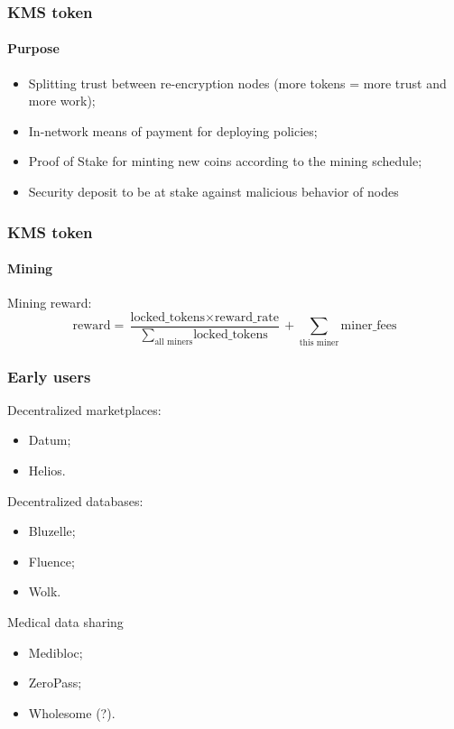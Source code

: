 \documentclass[xetex,mathsans,sans]{beamer}
\begin{document}
    \begin{frame}
        \frametitle{KMS token}
        \framesubtitle{Purpose}
        \begin{itemize}
            \item Splitting trust between re-encryption nodes (more tokens = more trust and more work);
            \item In-network means of payment for deploying policies;
            \item Proof of Stake for minting new coins according to the mining schedule;
            \item Security deposit to be at stake against malicious behavior of nodes
        \end{itemize}
    \end{frame}

    \begin{frame}
        \frametitle{KMS token}
        \framesubtitle{Mining}
        Mining reward:
        $$\text{reward} = \frac{\text{locked\_tokens} \times \text{reward\_rate}}{\sum_{\text{all miners}} {\text{locked\_tokens}}} + \sum_{\text{this miner}} {\text{miner\_fees}}$$
    \end{frame}

    \begin{frame}
        \frametitle{Early users}
        Decentralized marketplaces:
        \begin{itemize}
            \item Datum;
            \item Helios.
        \end{itemize}
        Decentralized databases:
        \begin{itemize}
            \item Bluzelle;
            \item Fluence;
            \item Wolk.
        \end{itemize}
        Medical data sharing
        \begin{itemize}
            \item Medibloc;
            \item ZeroPass;
            \item Wholesome (?).
        \end{itemize}
    \end{frame}
\end{document}
